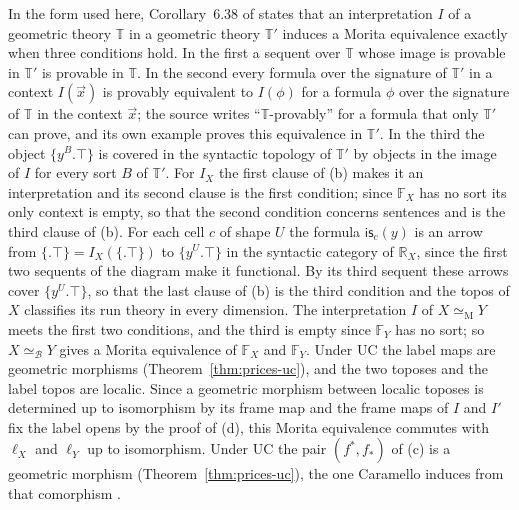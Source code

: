 \documentclass{lmcs}
\theoremstyle{definition}
\theoremstyle{remark}
\newcommand{\Tt}{\mathbb{T}}
\newcommand{\prin}[1]{\mathrm{#1}}
\newcommand{\UC}{\prin{UC}}
\newcommand{\FX}[1]{\mathbb{F}_{#1}}
\newcommand{\RX}[1]{\mathbb{R}_{#1}}
\newcommand{\IX}[1]{I_{#1}}
\newcommand{\nm}[1]{\mathsf{is}_{#1}}
\newcommand{\eqM}{\simeq_{\mathrm{M}}}
\providecommand{\eqB}{\simeq_{\mathcal{B}}}
\providecommand{\fin}{f^{\ast}}
\providecommand{\fsh}{f_{\ast}}
\begin{document}
In the form used here, Corollary~6.38 of \cite{Caramello19} states that an interpretation $I$
of a geometric theory $\Tt$ in a geometric theory $\Tt'$ induces a Morita equivalence exactly when three
conditions hold. In the first a sequent over $\Tt$ whose image is provable in $\Tt'$ is provable in $\Tt$. In
the second every formula over the signature of $\Tt'$ in a context $I(\vec x)$ is provably equivalent to
$I(\phi)$ for a formula $\phi$ over the signature of $\Tt$ in the context $\vec x$; the source writes
``$\Tt$-provably'' for a formula that only $\Tt'$ can prove, and its own example proves this equivalence in
$\Tt'$. In the third the object $\{y^B.\top\}$ is covered in the
syntactic topology of $\Tt'$ by objects in the image of $I$ for every sort $B$ of $\Tt'$. For $\IX{X}$
the first clause of (b) makes it an interpretation and its second clause is the first condition; since $\FX{X}$
has no sort its only context is empty, so that the second condition concerns sentences and is the third clause
of (b). For each cell $c$ of shape $U$ the formula $\nm{c}(y)$ is an arrow from $\{.\top\}=\IX{X}(\{.\top\})$ to
$\{y^U.\top\}$ in the syntactic category of $\RX{X}$, since the first two sequents of the diagram make it functional.
By its third sequent these arrows cover $\{y^U.\top\}$, so that the last clause of (b) is
the third condition and the topos of $X$ classifies its run theory in every dimension. The interpretation $I$ of
$X\eqM Y$ meets the first two conditions, and the third is empty since $\FX{Y}$ has no
sort; so $X\eqB Y$ gives a Morita equivalence of $\FX{X}$ and $\FX{Y}$. Under
$\UC$ the label maps are geometric morphisms (Theorem~\ref{thm:prices-uc}), and the two toposes and the label topos are
localic. Since a geometric morphism between localic toposes is determined up to isomorphism by its frame
map \cite[Section~C1.4]{Johnstone02} and the frame maps of $I$ and $I'$ fix the label opens by the proof of (d), this Morita
equivalence commutes with $\ell_X$ and $\ell_Y$ up to isomorphism. Under $\UC$ the
pair $(\fin,\fsh)$ of (c) is a geometric morphism (Theorem~\ref{thm:prices-uc}), the one Caramello induces from that
comorphism \cite{Caramello19}.
\end{document}
